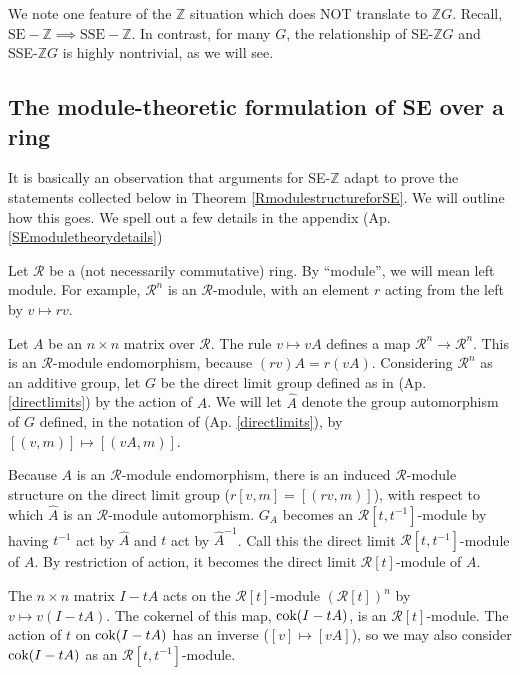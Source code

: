\documentclass{amsart}
\theoremstyle{definition}
\theoremstyle{definition}
\newcommand{\apr}{(Ap. \ref}
\newcommand{\Z}{\mathbb Z}
\newcommand{\ZG}{\mathbb Z G}
\newcommand{\cok}{\textnormal{cok}}
\numberwithin{equation}{subsection}
\begin{document}
We note one feature of the $\Z$ situation which does NOT
translate to $\ZG$.
Recall, $\text{SE}-\Z \implies \text{SSE}-\Z$.
 In contrast, for many $G$,
the relationship of SE-$\Z G$  and
SSE-$\Z G$ is  highly nontrivial,
as we will see.

\subsection{The module-theoretic formulation of
  SE over a ring}\label{SEmoduletheory}

It is basically an observation that  arguments for SE-$\Z$
adapt to prove the  statements collected below in
Theorem \ref{RmodulestructureforSE}.
We will  outline how this goes.
We spell out  a few  details  in the appendix
 \apr{SEmoduletheorydetails})

Let $\mathcal R$ be a   (not necessarily commutative)
ring. By ``module'', we will mean left module.
For example,
$\mathcal R^n$ is an  $\mathcal R$-module,
with an element $r$ acting from the left by $v\mapsto rv$.


Let $A$ be an $n\times n$ matrix over $\mathcal R$.
The rule $v\mapsto vA$ 
 defines a map
$\mathcal R^n \to \mathcal R^n $. 
This is an $\mathcal R$-module endomorphism,
because $(rv)A = r(vA)$.
Considering $\mathcal R^n$
as an additive group,
let
$G$ be the direct limit group
defined as in
\apr{directlimits})
 by
 the action of $A$. We will
let
$\widehat A$ denote the group automorphism of $G$
defined, in the notation of \apr{directlimits}),
by $[(v,m)]\mapsto [(vA,m)]$.

Because $A$ is an $\mathcal R$-module endomorphism,
there is an induced $\mathcal R$-module structure on
the direct limit group
($r[v,m] = [(rv,m)]$), 
with respect to which
$\widehat A$ is an $\mathcal R$-module automorphism.
$G_A$ becomes an $\mathcal R[t,t^{-1}]$-module
  by having $t^{-1}$ act by $\widehat A$ and
 $t$ act by $\widehat A^{-1}$.
Call this the
direct limit  $\mathcal R[t,t^{-1}]$-module of $A$.
By restriction of action, it becomes the
direct limit  $\mathcal R[t]$-module of $A$.


The $n\times n$ matrix $I-tA$ acts on
the $\mathcal R[t]$-module $(\mathcal R[t])^n$ by
 $v\mapsto v(I-tA)$. The cokernel of this map,
$\cok (I-tA)$, is an $\mathcal R[t]$-module. The action of $t$
on $\cok (I-tA)$ has an inverse ($[v] \mapsto [vA]$), so
we may also consider $\cok (I-tA)$ as an $\mathcal R[t,t^{-1}]$-module.
\end{document}
